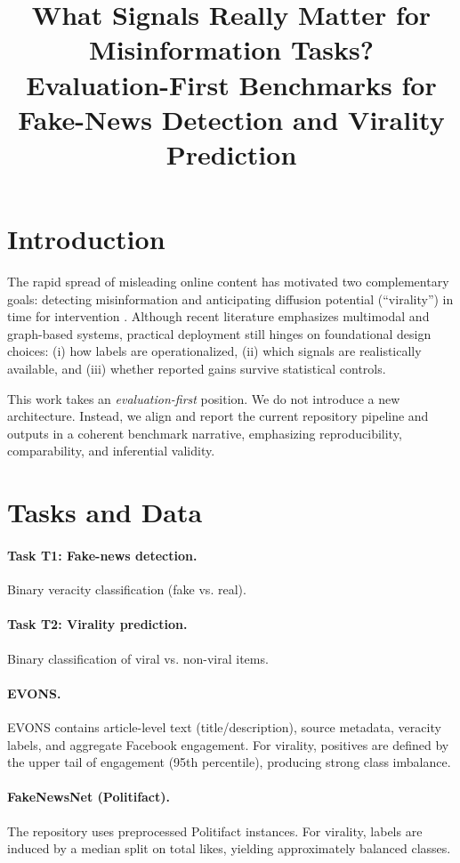 \documentclass[10pt, a4paper]{article}
\title{What Signals Really Matter for Misinformation Tasks? \\
Evaluation-First Benchmarks for Fake-News Detection and Virality Prediction}
\begin{document}
\maketitleabstract

\section{Introduction}
The rapid spread of misleading online content has motivated two complementary goals: detecting misinformation and anticipating diffusion potential (``virality'') in time for intervention \citep{Vosoughi2018,Lazer2018,Shu2017}. Although recent literature emphasizes multimodal and graph-based systems, practical deployment still hinges on foundational design choices: (i) how labels are operationalized, (ii) which signals are realistically available, and (iii) whether reported gains survive statistical controls.

This work takes an \emph{evaluation-first} position. We do not introduce a new architecture. Instead, we align and report the current repository pipeline and outputs in a coherent benchmark narrative, emphasizing reproducibility, comparability, and inferential validity.

\section{Tasks and Data}
\label{sec:tasks-data}

\paragraph{Task T1: Fake-news detection.}
Binary veracity classification (fake vs. real).

\paragraph{Task T2: Virality prediction.}
Binary classification of viral vs. non-viral items.

\paragraph{EVONS.}
EVONS contains article-level text (title/description), source metadata, veracity labels, and aggregate Facebook engagement. For virality, positives are defined by the upper tail of engagement (95th percentile), producing strong class imbalance.

\paragraph{FakeNewsNet (Politifact).}
The repository uses preprocessed Politifact instances. For virality, labels are induced by a median split on total likes, yielding approximately balanced classes.
\end{document}

